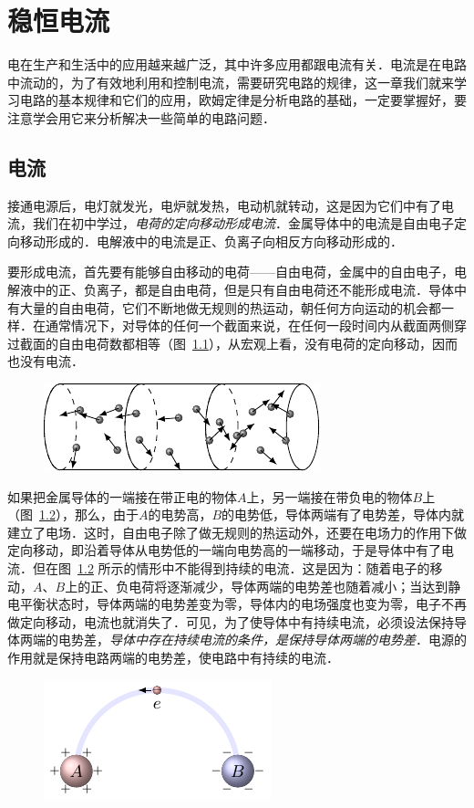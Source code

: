 \chapter{稳恒电流}\label{chapter-steady-current}

电在生产和生活中的应用越来越广泛，其中许多应用都跟电流有关．电流是在电路中流动的，为了有效地利用和控制电流，需要研究电路的规律，这一章我们就来学习电路的基本规律和它们的应用，欧姆定律是分析电路的基础，一定要掌握好，要注意学会用它来分析解决一些简单的电路问题．

\section{电流}
接通电源后，电灯就发光，电炉就发热，电动机就转动，这是因为它们中有了电流，我们在初中学过，\textit{电荷的定向移动形成电流}．金属导体中的电流是自由电子定向移动形成的．电解液中的电流是正、负离子向相反方向移动形成的．

要形成电流，首先要有能够自由移动的电荷——自由电荷，金属中的自由电子，电解液中的正、负离子，都是自由电荷，但是只有自由电荷还不能形成电流．导体中有大量的自由电荷，它们不断地做无规则的热运动，朝任何方向运动的机会都一样．在通常情况下，对导体的任何一个截面来说，在任何一段时间内从截面两侧穿过截面的自由电荷数都相等（图~\ref{fig_B_7-1}），从宏观上看，没有电荷的定向移动，因而也没有电流．
\begin{figure}[htbp]
    \centering
    \includegraphics{fig/B/7-1.pdf}
    \caption{}\label{fig_B_7-1}
\end{figure}

如果把金属导体的一端接在带正电的物体$A$上，另一端接在带负电的物体$B$上（图~\ref{fig_B_7-2}），那么，由于$A$的电势高，$B$的电势低，导体两端有了电势差，导体内就建立了电场．这时，自由电子除了做无规则的热运动外，还要在电场力的作用下做定向移动，即沿着导体从电势低的一端向电势高的一端移动，于是导体中有了电流．但在图~\ref{fig_B_7-2} 所示的情形中不能得到持续的电流．这是因为：随着电子的移动，$A$、$B$上的正、负电荷将逐渐减少，导体两端的电势差也随着减小；当达到静电平衡状态时，导体两端的电势差变为零，导体内的电场强度也变为零，电子不再做定向移动，电流也就消失了．可见，为了使导体中有持续电流，必须设法保持导体两端的电势差，\textit{导体中存在持续电流的条件，是保持导体两端的电势差}．电源的作用就是保持电路两端的电势差，使电路中有持续的电流．
\begin{figure}[htbp]
    \centering
    \includegraphics{fig/B/7-2.pdf}
    \caption{}\label{fig_B_7-2}
\end{figure}


